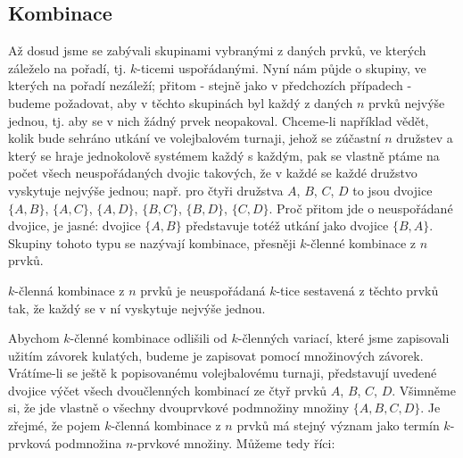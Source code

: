           

      \subsection{Kombinace}\label{mai:IchapIVsecIssecIV}
        Až dosud jsme se zabývali skupinami vybranými z daných prvků, ve kterých záleželo na pořadí,
        tj. \(k\)-ticemi uspořádanými. Nyní nám půjde o skupiny, ve kterých na pořadí nezáleží;
        přitom - stejně jako v předchozích případech - budeme požadovat, aby v těchto skupinách byl
        každý z daných \(n\) prvků nejvýše jednou, tj. aby se v nich žádný prvek neopakoval.
        Chceme-li například vědět, kolik bude sehráno utkání ve volejbalovém turnaji, jehož se
        zúčastní \(n\) družstev a který se hraje jednokolově systémem každý s každým, pak se vlastně
        ptáme na počet všech neuspořádaných dvojic takových, že v každé se každé družstvo vyskytuje
        nejvýše jednou; např. pro čtyři družstva \(A\), \(B\), \(C\), \(D\) to jsou dvojice \(\{A,
        B\}\), \(\{A,C\}\), \(\{A, D\}\), \(\{B,C\}\), \(\{B, D\}\), \(\{C, D\}\). Proč přitom jde o
        neuspořádané dvojice, je jasné: dvojice \(\{A, B\}\) představuje totéž utkání jako dvojice
        \(\{B, A\}\). Skupiny tohoto typu se nazývají kombinace, přesněji \(k\)-členné kombinace z
        \(n\) prvků.

        \begin{mdframed}[style=highlight] 
          \(k\)-členná kombinace z \(n\) prvků je neuspořádaná \(k\)-tice sestavená z těchto prvků 
          tak, že každý se v ní vyskytuje nejvýše jednou.
        \end{mdframed}  

        Abychom \(k\)-členné kombinace odlišili od \(k\)-členných variací, které jsme zapisovali
        užitím závorek kulatých, budeme je zapisovat pomocí množinových závorek. Vrátíme-li se ještě
        k popisovanému volejbalovému turnaji, představují uvedené dvojice výčet všech dvoučlenných
        kombinací ze čtyř prvků \(A\), \(B\), \(C\), \(D\). Všimněme si, že jde vlastně o všechny
        dvouprvkové podmnožiny množiny \(\{A, B, C, D\}\). Je zřejmé, že pojem \(k\)-členná
        kombinace z \(n\) prvků má stejný význam jako termín \(k\)-prvková podmnožina \(n\)-prvkové
        množiny. Můžeme tedy říci:

